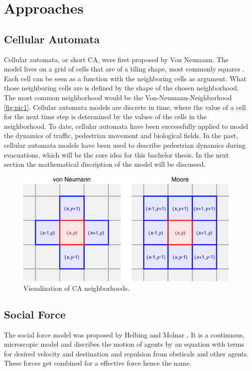 \newpage
\section{Approaches}
\subsection{Cellular Automata}
Cellular automata, or short CA, were first proposed by Von Neumann. 
The model lives on a grid of cells that are of a tiling shape, most commonly squares \cite{Michi}.
Each cell can be seen as a function with the neighboring cells as argument. 
What those neighboring cells are is defined by the shape of the chosen neighborhood. 
The most common neighborhood would be the Von-Neumann-Neighborhood \autoref{fig:pic1}.
Cellular automata models are discrete in time, 
where the value of a cell for the next time step is determined by the values of the cells in the neighborhood. 
To date, cellular automata have been successfully applied to model the dynamics of traffic, pedestrian movement and biological fields. 
In the past, cellular automata models have been used to describe pedestrian dynamics during evacuations, which will be the core idea for this bachelor thesis.
In the next section the mathematical discription of the model will be discussed. 

\begin{figure} 
   \centering 
   \includegraphics[width=0.8\linewidth]{content/figures/CA_Umgebungen.png} 
   \caption{Visualization of CA neighborhoods.}
   \label{fig:pic1}
\end{figure}

\subsection{Social Force}
The social force model was proposed by Helbing and Molnar \cite{helbing1995social}.
It is a continuous, microscopic model and discribes the motion of agents by an equation with terms for desired velocity and destination and repulsion from obsticals and other agents.
These forces get combined for a effective force hence the name. 

